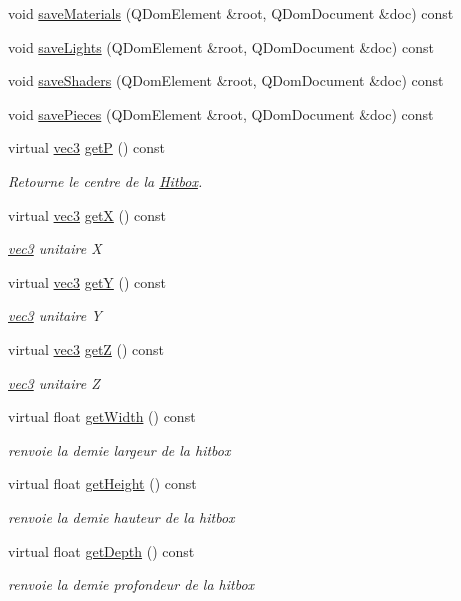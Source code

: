 \begin{DoxyCompactItemize}
void \hyperlink{class_scene_a23faaec79e3e47ab7827411f23dd79d9}{save\+Materials} (Q\+Dom\+Element \&root, Q\+Dom\+Document \&doc) const 
\item 
void \hyperlink{class_scene_a13dc69fb963cd556e3029e7ffc55180b}{save\+Lights} (Q\+Dom\+Element \&root, Q\+Dom\+Document \&doc) const 
\item 
void \hyperlink{class_scene_abaec7f89a0a039c5a770ce06e80d96cd}{save\+Shaders} (Q\+Dom\+Element \&root, Q\+Dom\+Document \&doc) const 
\item 
void \hyperlink{class_scene_ab51c69ad1faae20cf5375c3f02b6e7fc}{save\+Pieces} (Q\+Dom\+Element \&root, Q\+Dom\+Document \&doc) const 
\item 
virtual \hyperlink{structvec3}{vec3} \hyperlink{class_scene_a31be15d8114d6d9c01c312cbe1a41ed6}{get\+P} () const 
\begin{DoxyCompactList}\small\item\em Retourne le centre de la \hyperlink{class_hitbox}{Hitbox}. \end{DoxyCompactList}\item 
virtual \hyperlink{structvec3}{vec3} \hyperlink{class_scene_a1a35eb36ad2c6b5bf748c31933e4ea5b}{get\+X} () const 
\begin{DoxyCompactList}\small\item\em \hyperlink{structvec3}{vec3} unitaire X \end{DoxyCompactList}\item 
virtual \hyperlink{structvec3}{vec3} \hyperlink{class_scene_a8b925540bc8fc2976eec67998f5c3bd3}{get\+Y} () const 
\begin{DoxyCompactList}\small\item\em \hyperlink{structvec3}{vec3} unitaire Y \end{DoxyCompactList}\item 
virtual \hyperlink{structvec3}{vec3} \hyperlink{class_scene_a4762ba0c1a51eeba4a19a515b546b6bd}{get\+Z} () const 
\begin{DoxyCompactList}\small\item\em \hyperlink{structvec3}{vec3} unitaire Z \end{DoxyCompactList}\item 
virtual float \hyperlink{class_scene_a3fa3346da04b7aa00cb5a30171e70a24}{get\+Width} () const 
\begin{DoxyCompactList}\small\item\em renvoie la demie largeur de la hitbox \end{DoxyCompactList}\item 
virtual float \hyperlink{class_scene_a83026eeb7ec401111634beb553cb2f8e}{get\+Height} () const 
\begin{DoxyCompactList}\small\item\em renvoie la demie hauteur de la hitbox \end{DoxyCompactList}\item 
virtual float \hyperlink{class_scene_a96b58a841f6295813072d258aa9a9236}{get\+Depth} () const 
\begin{DoxyCompactList}\small\item\em renvoie la demie profondeur de la hitbox \end{DoxyCompactList}\end{DoxyCompactItemize}
